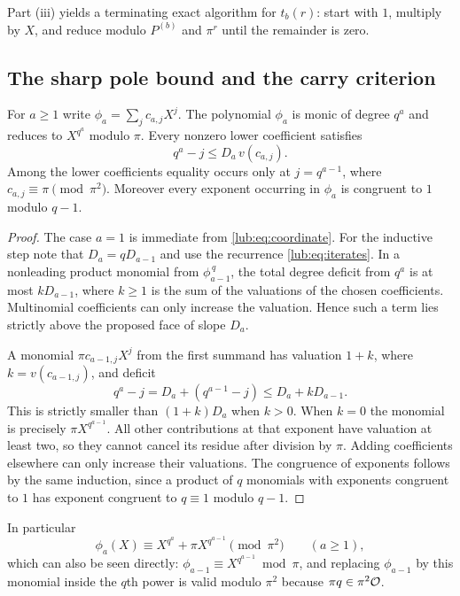 Part (iii) yields a terminating exact algorithm for $t_b(r)$: start with $1$, multiply by
$X$, and reduce modulo $P^{(b)}$ and $\pi^r$ until the remainder is zero.

\subsection{The sharp pole bound and the carry criterion}\label{lub:ssec:pole}
\begingroup\raggedright{}\endgroup

\begin{lemma}\label{lub:lem:face}
For $a\ge1$ write $\phi_a=\sum_jc_{a,j}X^j$. The polynomial $\phi_a$ is monic of degree
$q^a$ and reduces to $X^{q^a}$ modulo $\pi$. Every nonzero lower coefficient satisfies
\[
 q^a-j\le D_a\,v(c_{a,j}).
\]
Among the lower coefficients equality occurs only at $j=q^{a-1}$, where
$c_{a,j}\equiv\pi\pmod{\pi^2}$. Moreover every exponent occurring in $\phi_a$ is congruent
to $1$ modulo $q-1$.
\end{lemma}
\begin{proof}
The case $a=1$ is immediate from \eqref{lub:eq:coordinate}. For the inductive step note
that $D_a=qD_{a-1}$ and use the recurrence \eqref{lub:eq:iterates}. In a nonleading product
monomial from $\phi_{a-1}^{\,q}$, the total degree deficit from $q^a$ is at most
$kD_{a-1}$, where $k\ge1$ is the sum of the valuations of the chosen coefficients.
Multinomial coefficients can only increase the valuation. Hence such a term lies strictly
above the proposed face of slope $D_a$.

A monomial $\pi c_{a-1,j}X^j$ from the first summand has valuation $1+k$, where
$k=v(c_{a-1,j})$, and deficit
\[
 q^a-j=D_a+(q^{a-1}-j)\le D_a+kD_{a-1}.
\]
This is strictly smaller than $(1+k)D_a$ when $k>0$. When $k=0$ the monomial is precisely
$\pi X^{q^{a-1}}$. All other contributions at that exponent have valuation at least two, so
they cannot cancel its residue after division by $\pi$. Adding coefficients elsewhere can
only increase their valuations. The congruence of exponents follows by the same induction,
since a product of $q$ monomials with exponents congruent to $1$ has exponent congruent to
$q\equiv1$ modulo $q-1$.
\end{proof}

In particular
\begin{equation}\label{lub:eq:modsquare}
 \phi_a(X)\equiv X^{q^a}+\pi X^{q^{a-1}}\pmod{\pi^2}\qquad(a\ge1),
\end{equation}
which can also be seen directly: $\phi_{a-1}\equiv X^{q^{a-1}}\bmod\pi$, and replacing
$\phi_{a-1}$ by this monomial inside the $q$th power is valid modulo $\pi^2$ because
$\pi q\in\pi^2\mathcal{O}$.

